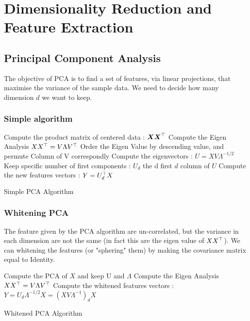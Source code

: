 \chapter{Dimensionality Reduction and Feature Extraction} %
\label{cha:dimensionality_reduction}

\section{Principal Component Analysis} %
	\label{sec:principal_component_analysis}
	
	The objective of PCA is to find a set of features, via linear projections, that maximise the variance of the sample data. We need to decide how many dimension $d$ we want to keep. 
 
	\subsection{Simple algorithm} %
		\label{sub:simple_algorithm}
	
		\begin{algorithm}[H]
				Compute the product matrix of centered data : ${\boldsymbol{{X}}} {\boldsymbol{{X}}} ^\top$\;
				Compute the Eigen Analysis $X X^\top = V \Lambda V ^\top$ \;
				Order the Eigen Value by descending value, and permute Column of V correspondly\; 
				Compute the eigenvectors : $U = X V \Lambda^{-1/2}$\;
				Keep specific number of first components : $U_d$ the d first $d$ column of $U$ \;
				Compute the new features vectors : $Y = U_d^\top X$ 
				\caption{Simple PCA Algorithm}
			\end{algorithm}

	\subsection{Whitening PCA} %
		\label{sub:whitening_pca}

		The feature given by the PCA algorithm are un-correlated, but the variance in each dimension are not the same (in fact this are the eigen value of $X X^\top$). We can whitening the features (or "sphering" them) by making the covariance matrix equal to Identity.

		\begin{algorithm}[H]
				Compute the PCA of $X$ and keep U and $\Lambda$\;
				Compute the Eigen Analysis $X X^\top = V \Lambda V ^\top$ \;
				Compute the whitened features vectors : $Y = U_d \Lambda ^{-1/2} X = (X V \Lambda ^{-1})_d X $
				\caption{Whitened PCA Algorithm}
			\end{algorithm}

